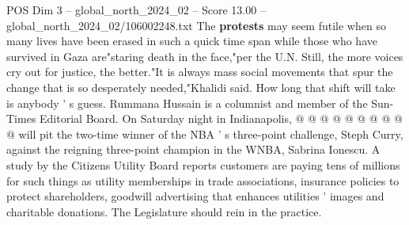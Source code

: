 \begin{textsample}{POS Dim 3 – global\_north\_2024\_02 – Score 13.00 – global\_north\_2024\_02/106002248.txt}
The \textbf{protests} may seem futile when so many lives have been erased in such a quick time span while those who have survived in Gaza are"staring death in the face,"per the U.N.
Still, the more voices cry out for justice, the better."It is always mass social movements that spur the change that is so desperately needed,"Khalidi said.
How long that shift will take is anybody ' s guess.
Rummana Hussain is a columnist and member of the Sun-Times Editorial Board.
On Saturday night in Indianapolis, @ @ @ @ @ @ @ @ @ @ will pit the two-time winner of the NBA ' s three-point challenge, Steph Curry, against the reigning three-point champion in the WNBA, Sabrina Ionescu.
A study by the Citizens Utility Board reports customers are paying tens of millions for such things as utility memberships in trade associations, insurance policies to protect shareholders, goodwill advertising that enhances utilities ' images and charitable donations.
The Legislature should rein in the practice.

\end{textsample}
